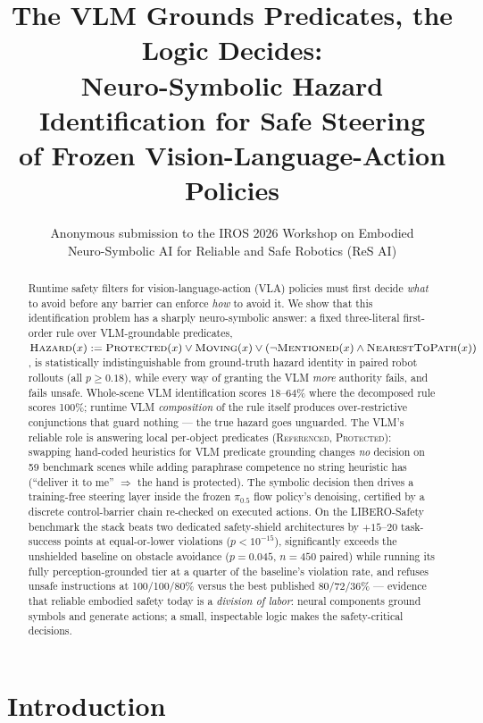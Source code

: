 \documentclass[conference]{IEEEtran}
\title{\LARGE \bf The VLM Grounds Predicates, the Logic Decides:\\
Neuro-Symbolic Hazard Identification for Safe Steering\\of Frozen Vision-Language-Action Policies}
\author{Anonymous submission to the IROS 2026 Workshop on Embodied\\
Neuro-Symbolic AI for Reliable and Safe Robotics (ReS AI)}
\providecommand{\coloneqq}{\mathrel{:=}}
\begin{document}
\maketitle

\begin{abstract}
Runtime safety filters for vision-language-action (VLA) policies must first decide \emph{what} to avoid before any barrier can enforce \emph{how} to avoid it. We show that this identification problem has a sharply neuro-symbolic answer: a fixed three-literal first-order rule over VLM-groundable predicates,
$\textsc{Hazard}(x) \coloneqq \textsc{Protected}(x)\vee\textsc{Moving}(x)\vee(\lnot\textsc{Mentioned}(x)\wedge\textsc{NearestToPath}(x))$,
is statistically indistinguishable from ground-truth hazard identity in paired robot rollouts (all $p\ge0.18$), while every way of granting the VLM \emph{more} authority fails, and fails unsafe. Whole-scene VLM identification scores 18--64\% where the decomposed rule scores 100\%; runtime VLM \emph{composition} of the rule itself produces over-restrictive conjunctions that guard nothing --- the true hazard goes unguarded. The VLM's reliable role is answering local per-object predicates (\textsc{Referenced}, \textsc{Protected}): swapping hand-coded heuristics for VLM predicate grounding changes \emph{no} decision on 59 benchmark scenes while adding paraphrase competence no string heuristic has (``deliver it to me'' $\Rightarrow$ the hand is protected). The symbolic decision then drives a training-free steering layer inside the frozen $\pi_{0.5}$ flow policy's denoising, certified by a discrete control-barrier chain re-checked on executed actions. On the LIBERO-Safety benchmark the stack beats two dedicated safety-shield architectures by $+15$--$20$ task-success points at equal-or-lower violations ($p{<}10^{-15}$), significantly exceeds the unshielded baseline on obstacle avoidance ($p{=}0.045$, $n{=}450$ paired) while running its fully perception-grounded tier at a quarter of the baseline's violation rate, and refuses unsafe instructions at 100/100/80\% versus the best published 80/72/36\% --- evidence that reliable embodied safety today is a \emph{division of labor}: neural components ground symbols and generate actions; a small, inspectable logic makes the safety-critical decisions.
\end{abstract}

\section{Introduction}
\label{sec:intro}
\end{document}
